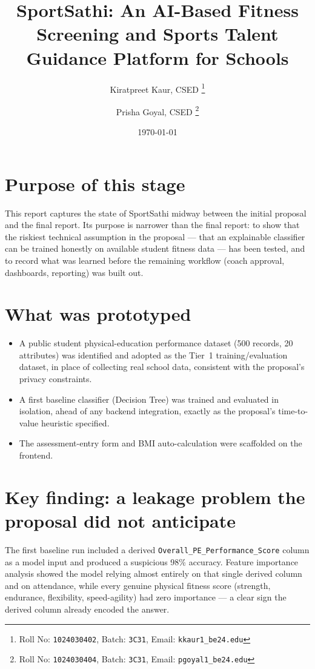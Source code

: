 \documentclass[11pt,a4paper]{article}
\title{SportSathi: An AI-Based Fitness Screening and Sports Talent Guidance Platform for Schools}
\author{
  Kiratpreet Kaur, CSED%
  \thanks{Roll No: \texttt{1024030402}, Batch: \texttt{3C31}, %
    Email: \texttt{kkaur1\_be24\@thapar.edu}}
  \and
  Prisha Goyal, CSED%
  \thanks{Roll No: \texttt{1024030404}, Batch: \texttt{3C31}, %
    Email: \texttt{pgoyal1\_be24\@thapar.edu}}
}
\date{\today}
\begin{document}
\maketitle

\section{Purpose of this stage}
This report captures the state of SportSathi midway
between the initial proposal and the final report. Its
purpose is narrower than the final report: to show that the
riskiest technical assumption in the proposal --- that an
explainable classifier can be trained honestly on available
student fitness data --- has been tested, and to record what
was learned before the remaining workflow (coach approval,
dashboards, reporting) was built out.

\section{What was prototyped}
\begin{itemize}[leftmargin=0.7cm]
    \item A public student physical-education performance dataset (500 records, 20 attributes) was identified and adopted as the Tier~1 training/evaluation dataset, in place of collecting real school data, consistent with the proposal's privacy constraints.
    \item A first baseline classifier (Decision Tree) was trained and evaluated in isolation, ahead of any backend integration, exactly as the proposal's time-to-value heuristic specified.
    \item The assessment-entry form and BMI auto-calculation were scaffolded on the frontend.
\end{itemize}

\section{Key finding: a leakage problem the proposal did not anticipate}
The first baseline run included a derived
\texttt{Overall\_PE\_Performance\_Score} column as a model
input and produced a suspicious 98\% accuracy. Feature
importance analysis showed the model relying almost
entirely on that single derived column and on attendance,
while every genuine physical fitness score (strength,
endurance, flexibility, speed-agility) had zero importance
--- a clear sign the derived column already encoded the
answer.
\end{document}
